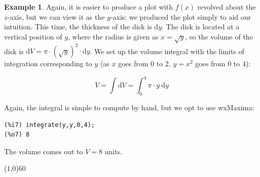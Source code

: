 \documentclass[10.5pt,twoside]{report}
\theoremstyle{definition}
\newtheorem{exmp}{Example}[section]
\begin{document}
\begin{exmp}
Again, it is easier to produce a plot with $f(x)$ revolved about the $z$-axis, but we can view it as the $y$-axis:  we produced the plot simply to aid our intuition.  This time, the thickness of the disk is $\mathrm{d}y$.  The disk is located at a vertical position of $y$, where the radius is given as $x=\sqrt{y}$, so the volume of the disk is $\mathrm{d}V=\pi\cdot (\sqrt{y})^2\cdot \mathrm{d}y$.  We set up the volume integral with the limits of integration corresponding to $y$ (as $x$ goes from 0 to 2, $y=x^2$ goes from 0 to 4):

\[V=\int \mathrm{d}V = \int_0^4 \pi\cdot y\ \mathrm{d}y\]

Again, the integral is simple to compute by hand, but we opt to use wxMaxima:

\begin{verbatim}
(%i7) integrate(y,y,0,4);
(%o7) 8
\end{verbatim}

The volume comes out to $V=8$ units.



\end{exmp}

\line(1,0){60}
\linethickness{0.5mm}
\end{document}
